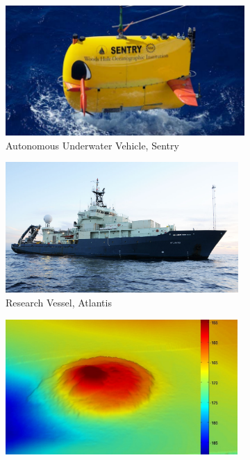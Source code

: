 \documentclass[jair,twoside,11pt,theapa]{article}
\begin{document}
\begin{figure}[ht!]
   	\centering
    \begin{subfigure}[b]{0.45\textwidth}
	    \centering
       \includegraphics[width=\textwidth]{figures/sentry.pdf}
       \caption{Autonomous Underwater Vehicle, Sentry}
       \label{fig:sentry}
    \end{subfigure}
	\begin{subfigure}[b]{0.45\textwidth}
		\centering
		\includegraphics[width=0.975\textwidth]{figures/atlantis.pdf}
		\caption{Research Vessel, Atlantis}
		\label{fig:atlantis}
	\end{subfigure}
	\begin{subfigure}[b]{0.45\textwidth}
		\centering
	     \includegraphics[width=0.97\textwidth]{figures/asphalt_domes.pdf}

\end{subfigure}
\end{figure}
\end{document}
